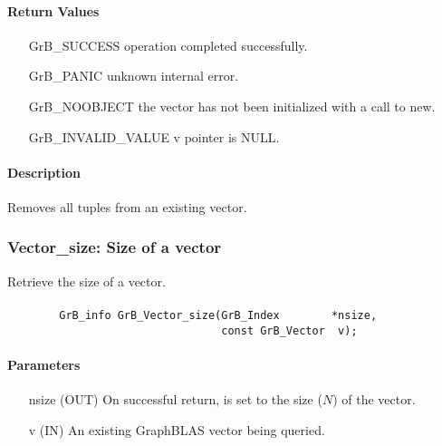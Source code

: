 \paragraph{Return Values}

\begin{itemize}[leftmargin=2.1in]
\item[{\sf GrB\_SUCCESS}]   operation completed successfully.
\item[{\sf GrB\_PANIC}]     unknown internal error.
\item[{\sf GrB\_NOOBJECT}]  the vector has not been initialized with a call to new.
\item[{\sf GrB\_INVALID\_VALUE}]    {\sf v} pointer is {\sf NULL}.
\end{itemize}

\paragraph{Description}

Removes all tuples from an existing vector.

\subsubsection{{\sf Vector\_size}: Size of a vector}

Retrieve the size of a vector.

\paragraph{\syntax}

\begin{verbatim}
        GrB_info GrB_Vector_size(GrB_Index        *nsize,
                                 const GrB_Vector  v);
\end{verbatim}

\paragraph{Parameters}

\begin{itemize}[leftmargin=1.1in]
    \item[{\sf nsize}] ({\sf OUT}) On successful return, is set to the size ($N$) 
                                   of the vector.
    \item[{\sf v}]     ({\sf IN})  An existing GraphBLAS vector being queried.
\end{itemize}

